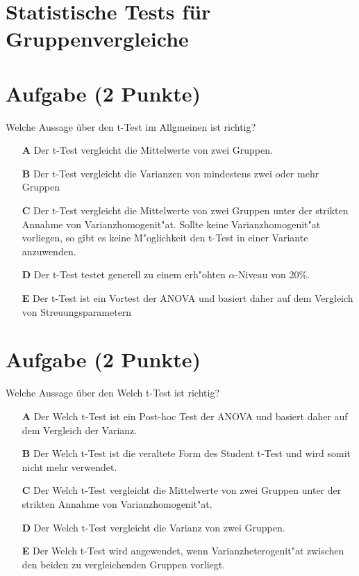 \documentclass[a4paper, 9pt]{scrartcl}\usepackage[]{graphicx}\usepackage[]{xcolor}
\begin{document}
\section*{Statistische Tests für Gruppenvergleiche} 

\section{Aufgabe \hfill (2 Punkte)}

Welche Aussage {\"u}ber den t-Test im Allgmeinen ist richtig? 



\begin{enumerate}
\item [\textbf{A} \msquare] Der t-Test vergleicht die Mittelwerte von zwei Gruppen.
\item [\textbf{B} \msquare] Der t-Test vergleicht die Varianzen von mindestens zwei oder mehr Gruppen
\item [\textbf{C} \msquare] Der t-Test vergleicht die Mittelwerte von zwei Gruppen unter der strikten Annahme von Varianzhomogenit{"a}t. Sollte keine Varianzhomogenit{"a}t vorliegen, so gibt es keine M{"o}glichkeit den t-Test in einer Variante anzuwenden.
\item [\textbf{D} \msquare] Der t-Test testet generell zu einem erh{"o}hten $\alpha$-Niveau von 20\%.
\item [\textbf{E} \msquare] Der t-Test ist ein Vortest der ANOVA und basiert daher auf dem Vergleich von Streuungsparametern
\end{enumerate}

\section{Aufgabe \hfill (2 Punkte)}

Welche Aussage {\"u}ber den Welch t-Test ist richtig?



\begin{enumerate}
\item [\textbf{A} \msquare] Der Welch t-Test ist ein Post-hoc Test der ANOVA und basiert daher auf dem Vergleich der Varianz.
\item [\textbf{B} \msquare] Der Welch t-Test ist die veraltete Form des Student t-Test und wird somit nicht mehr verwendet.
\item [\textbf{C} \msquare] Der Welch t-Test vergleicht die Mittelwerte von zwei Gruppen unter der strikten Annahme von Varianzhomogenit{"a}t.
\item [\textbf{D} \msquare] Der Welch t-Test vergleicht die Varianz von zwei Gruppen.
\item [\textbf{E} \msquare] Der Welch t-Test wird angewendet, wenn Varianzheterogenit{"a}t zwischen den beiden zu vergleichenden Gruppen vorliegt.
\end{enumerate}
\end{document}
